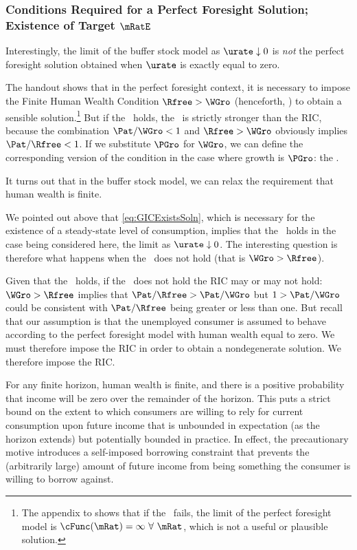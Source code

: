 \documentclass{\handout}
\begin{document}
\subsubsection{Conditions Required for a Perfect Foresight Solution; Existence of Target $\mRatE$}

Interestingly, the limit of the buffer stock model as $\urate \downarrow 0$ is {\it not} the perfect foresight solution obtained when $\urate$ is exactly equal to zero.%

The handout  shows that in the perfect foresight context, it is necessary to impose the Finite Human Wealth Condition $\Rfree > \WGro$ (henceforth, \FHWCWGro) to obtain a sensible solution.\footnote{The appendix to  shows that if the \FHWCWGro~fails, the limit of the perfect foresight model is $\cFunc(\mRat)=\infty~\forall~\mRat$, which is not a useful or plausible solution.}  But if the \FHWCWGro~holds, the \GICWGro~is strictly stronger than the RIC, because the combination $\Pat/\WGro < 1$ and $\Rfree > \WGro$ obviously implies $\Pat/\Rfree < 1$.  If we substitute $\PGro$ for $\WGro$, we can define the corresponding version of the condition in the case where growth is $\PGro$: the \FHWCPGro.

It turns out that in the buffer stock model, we can relax the requirement that human wealth is finite.  

We pointed out above that \eqref{eq:GICExistsSoln}, which is necessary for the existence of a steady-state level of consumption, implies that the \GICPGro~holds in the case being considered here, the limit as $\urate \downarrow 0$.  The interesting question is therefore what happens when the \FHWCWGro~does not hold (that is $\WGro > \Rfree$).  

Given that the \GICWGro~holds, if the \FHWCWGro~does not hold the RIC may or may not hold:  $\WGro > \Rfree$ implies that $\Pat/\Rfree > \Pat/\WGro$ but $1 > \Pat/\WGro$ could be consistent with $\Pat/\Rfree$ being greater or less than one.  But recall that our assumption is that the unemployed consumer is assumed to behave according to the perfect foresight model with human wealth equal to zero.  We must therefore impose the RIC in order to obtain a nondegenerate solution.  We therefore impose the RIC.

For any finite horizon, human wealth is finite, and there is a positive probability that income will be zero over the remainder of the horizon.  This puts a strict bound on the extent to which consumers are willing to rely for current consumption upon future income that is unbounded in expectation (as the horizon extends) but potentially bounded in practice.  In effect, the precautionary motive introduces a self-imposed borrowing constraint that prevents the (arbitrarily large) amount of future income from being something the consumer is willing to borrow against.
\end{document}
